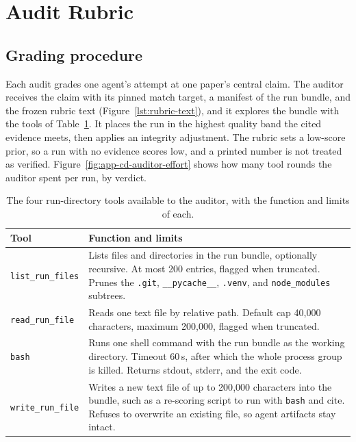 \section{Audit Rubric}
\label{app:rubric}

\subsection{Grading procedure}

Each audit grades one agent's attempt at one paper's central claim. The
auditor receives the claim with its pinned match target, a manifest of the run
bundle, and the frozen rubric text (Figure~\ref{lst:rubric-text}), and
it explores the bundle with the tools of Table~\ref{tab:audit-tools}. It places the run in the highest quality band the cited evidence meets,
then applies an integrity adjustment. The rubric
sets a low-score prior, so a run with no evidence scores low, and a printed number is not treated as verified.
Figure~\ref{fig:app-cd-auditor-effort} shows how many tool rounds the auditor
spent per run, by verdict.

\begin{table}[tb]
\centering
\footnotesize
\renewcommand{\arraystretch}{1.15}
\begin{tabular}{@{}l>{\raggedright\arraybackslash}p{10.6cm}@{}}
\toprule
Tool & Function and limits \\
\midrule
\texttt{list\_run\_files} & Lists files and directories in the run bundle,
optionally recursive. At most 200 entries, flagged when truncated. Prunes the
\texttt{.git}, \texttt{\_\_pycache\_\_}, \texttt{.venv}, and
\texttt{node\_modules} subtrees. \\
\texttt{read\_run\_file} & Reads one text file by relative path. Default cap
40{,}000 characters, maximum 200{,}000, flagged when truncated. \\
\texttt{bash} & Runs one shell command with the run bundle as the working
directory. Timeout 60\,s, after which the whole process group is killed.
Returns stdout, stderr, and the exit code. \\
\texttt{write\_run\_file} & Writes a new text file of up to 200{,}000 characters
into the bundle, such as a re-scoring script to run with \texttt{bash} and cite.
Refuses to overwrite an existing file, so agent artifacts stay intact. \\
\bottomrule
\end{tabular}
\caption{The four run-directory tools available to the auditor, with the
function and limits of each.}
\label{tab:audit-tools}
\end{table}

